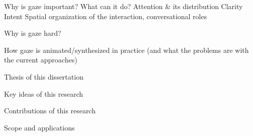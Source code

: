 Why is gaze important? What can it do?
Attention & its distribution
Clarity
Intent
Spatial organization of the interaction, conversational roles

Why is gaze hard?

How gaze is animated/synthesized in practice (and what the problems are with the current approaches)

Thesis of this dissertation

Key ideas of this research

Contributions of this research

Scope and applications
